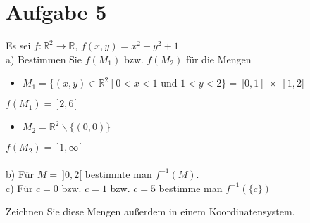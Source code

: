 \section*{Aufgabe 5}

Es sei $f: \mathbb{R}^2 \rightarrow \mathbb{R}$, $f(x,y) = x^2 + y^2 +1$\\

a) Bestimmen Sie $f(M_1)$ bzw. $f(M_2)$ für die Mengen

\begin{itemize}
\item $M_1 = \{(x,y) \in \mathbb{R}^2 \ | \ 0 < x < 1 \text{ und } 1 < y < 2\} = \ ]0,1[ \ \times \ ]1,2[$
\end{itemize}

$f(M_1) = \ ]2,6[$

\begin{itemize}
\item $M_2 = \mathbb{R}^2 \backslash \{(0,0)\}$
\end{itemize}

$f(M_2) = \ ]1, \infty[$\\~\\

b) Für $M = \ ]0,2[$ bestimmte man $f^{-1}(M)$.\\

c) Für $c = 0$ bzw. $c = 1$ bzw. $c = 5$ bestimme man $f^{-1}(\{c\})$\

\hspace{0.5cm}Zeichnen Sie diese Mengen außerdem in einem Koordinatensystem.

\newpage